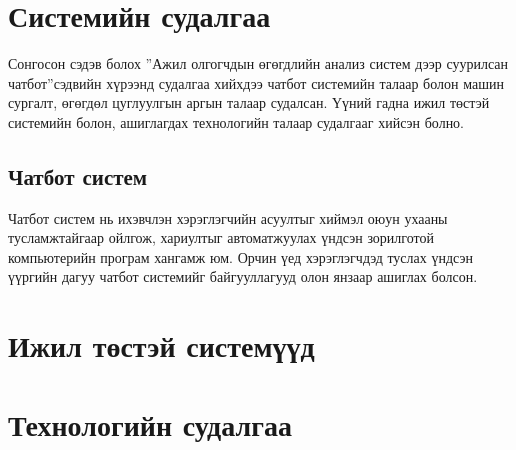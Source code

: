 \section{Системийн судалгаа}
Сонгосон сэдэв болох ”Ажил олгогчдын өгөгдлийн анализ систем дээр суурилсан чатбот”сэдвийн хүрээнд судалгаа хийхдээ чатбот системийн талаар болон машин сургалт, өгөгдөл цуглуулгын аргын талаар судалсан. Үүний гадна ижил төстэй системийн болон, ашиглагдах технологийн талаар судалгааг хийсэн болно. 
\subsection{Чатбот систем}
Чатбот систем нь ихэвчлэн хэрэглэгчийн асуултыг хиймэл оюун ухааны тусламжтайгаар ойлгож, хариултыг автоматжуулах үндсэн зорилготой компьютерийн програм хангамж юм. Орчин үед хэрэглэгчдэд туслах үндсэн үүргийн дагуу чатбот системийг байгууллагууд олон янзаар ашиглах болсон. 

\section{Ижил төстэй системүүд}

\section{Технологийн судалгаа}